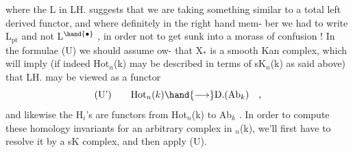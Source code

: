 
where the L in LH. suggests that we are taking something similar to a
total left derived functor, and where definitely in the right hand mem-%
ber we had to write L$_{\mathrm{pt}}$ and not L$^{\hand{\bullet}}$ , in order not to  get sunk
into a morass of confusion ! In the formulae (U) we should assume ow-
 that X$_{*}$ is a smooth Kan complex, which will imply (if indeed 
Hot$_n$(k) may be described in terms of sK$_n$(k) as said above) that LH.
may be viewed as a functor
\[ \text{(U')} \qquad \mathrm{Hot}_n(k) \hand{\longrightarrow} \mathrm{D.}(\mathrm{Ab}_k) \quad , \]
and likewise the H$_i$'s are functors from Hot$_n$(k) to Ab$_k$ . In order to
compute these homology invariants for an arbitrary complex in $_n$(k),
we'll first have to resolve it by a sK complex, and then apply (U).

